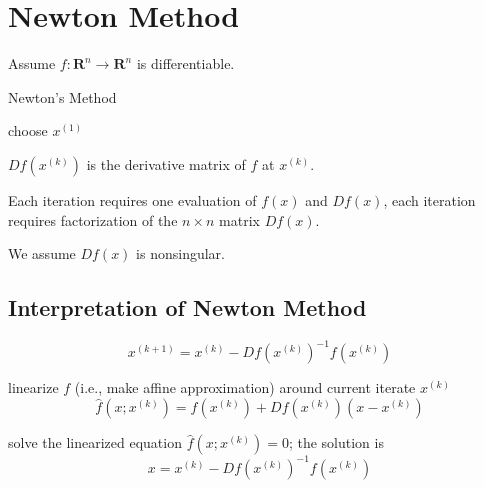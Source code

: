 \section{Newton Method}

\begin{proposition}
    Assume $ f: \mathbf{R}^{n} \rightarrow \mathbf{R}^{n} $ is differentiable.
\end{proposition}



\begin{algorithm}
    \caption{Newton's Method}
     choose $ x^{(1)} $\;
\end{algorithm}



$ D f\left(x^{(k)}\right) $ is the derivative matrix of $ f $ at $ x^{(k)} $. 

Each iteration requires one evaluation of $ f(x) $ and $ D f(x) $, each iteration requires factorization of the $ n \times n $ matrix $ D f(x) $.

\begin{proposition}
    We assume $ D f(x) $ is nonsingular.
\end{proposition}

\subsection{Interpretation of Newton Method}

\begin{equation}
x^{(k+1)}=x^{(k)}-D f\left(x^{(k)}\right)^{-1} f\left(x^{(k)}\right)
\end{equation}

linearize $ f $ (i.e., make affine approximation) around current iterate $ x^{(k)} $
\begin{equation}
\hat{f}\left(x ; x^{(k)}\right)=f\left(x^{(k)}\right)+D f\left(x^{(k)}\right)\left(x-x^{(k)}\right)
\end{equation}

solve the linearized equation $ \hat{f}\left(x ; x^{(k)}\right)=0 $; the solution is
\begin{equation}
x=x^{(k)}-D f\left(x^{(k)}\right)^{-1} f\left(x^{(k)}\right)
\end{equation}

